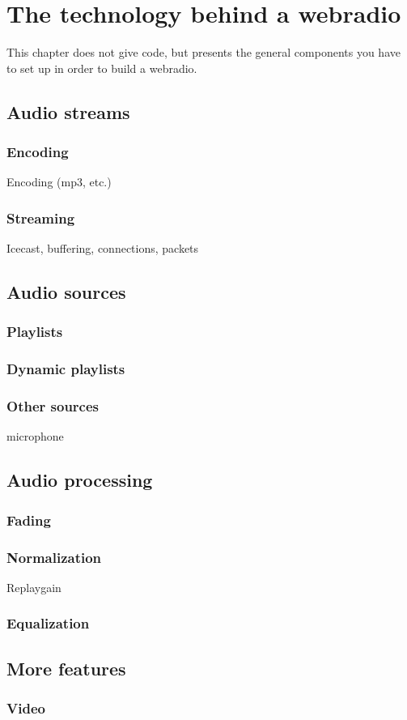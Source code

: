 \chapter{The technology behind a webradio}
This chapter does not give code, but presents the general components you have to
set up in order to build a webradio.

\section{Audio streams}
\subsection{Encoding}
Encoding (mp3, etc.)

\subsection{Streaming}
Icecast, buffering, connections, packets

\section{Audio sources}
\subsection{Playlists}

\subsection{Dynamic playlists}

\subsection{Other sources}
microphone

\section{Audio processing}
\subsection{Fading}
\subsection{Normalization}
Replaygain

\subsection{Equalization}

\section{More features}
\subsection{Video}